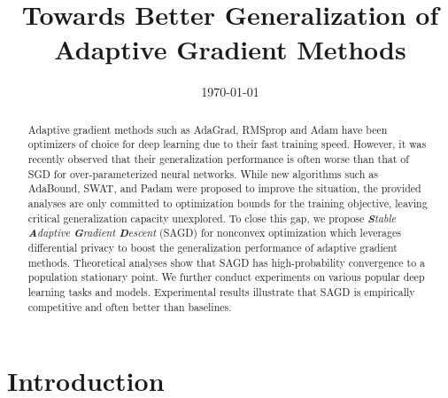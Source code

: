 \documentclass[11pt]{article}
\begin{document}
\title{\vspace{-0.1in}Towards Better Generalization of Adaptive Gradient Methods\vspace{-0.15in}}
\date{\today}

\maketitle


\begin{abstract}\vspace{-0.1in}
Adaptive gradient methods such as AdaGrad, RMSprop and Adam have been optimizers of choice for deep learning due to their fast training speed. However, it was recently observed that their generalization performance is often worse than that of SGD for over-parameterized neural networks. While new algorithms such as AdaBound, SWAT, and Padam were proposed to improve the situation, the provided analyses are only committed to optimization bounds for the training objective, leaving critical generalization capacity unexplored. 
To close this gap, we propose \textit{\textbf{S}table \textbf{A}daptive \textbf{G}radient \textbf{D}escent} (\textsc{SAGD}) for nonconvex optimization which leverages differential privacy to boost the generalization performance of adaptive gradient methods. 
Theoretical analyses show that \textsc{SAGD} has high-probability convergence to a population stationary point. 
We further conduct experiments on various popular deep learning tasks and models. 
Experimental results illustrate that \textsc{SAGD} is empirically competitive and often better than baselines. 
\end{abstract}

\vspace{-0.15in}
\section{Introduction}
\vspace{-0.05in}
\end{document}
